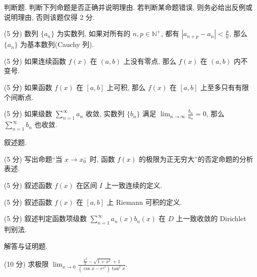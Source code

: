\par{}
判断题. 判断下列命题是否正确并说明理由. 若判断某命题错误, 则务必给出反例或说明理由, 否则该题仅得 2 分.\par
(5 分) 数列 $\{a_{n}\}$ 为实数列, 如果对所有的 $n, p \in \mathbb{N}^{+}$, 都有 $|a_{n+p} - a_{n}| < \frac{p}{n}$, 那么 $\{a_{n}\}$ 为基本数列(Cauchy 列).\par
(5 分) 如果连续函数 $f(x)$ 在 $(a, b)$ 上没有零点, 那么 $f(x)$ 在 $(a, b)$ 内不变号.\par
(5 分) 如果函数 $f(x)$ 在 $[a, b]$ 上可积, 那么 $f(x)$ 在 $[a, b]$ 上至多只有有限个间断点.\par
(5 分) 如果级数 $\sum_{n=1}^{\infty} a_n$ 收敛, 实数列 $\{b_n\}$ 满足 $\lim_{n \to \infty} \frac{b_n}{a_n} = 0$, 那么 $\sum_{n=1}^{\infty} b_n$ 也收敛.\par
\par{}
叙述题.\par
(5 分) 写出命题“当 $x \to x_0^-$ 时, 函数 $f(x)$ 的极限为正无穷大”的否定命题的分析表述.\par
(5 分) 叙述函数 $f(x)$ 在区间 $I$ 上一致连续的定义.\par
(5 分) 叙述函数 $f(x)$ 在 $[a, b]$ 上 Riemann 可积的定义.\par
(5 分) 叙述判定函数项级数 $\sum_{n=1}^{\infty} a_n(x) b_n(x)$ 在 $D$ 上一致收敛的 Dirichlet 判别法.\par
\par{}
解答与证明题.\par
(10 分) 求极限 $\lim_{x\to 0}\frac{\frac{x^2}{2} - \sqrt{1 + x^2} + 1}{(\cos x - e^{x^2})\tan^2x}.$\par
